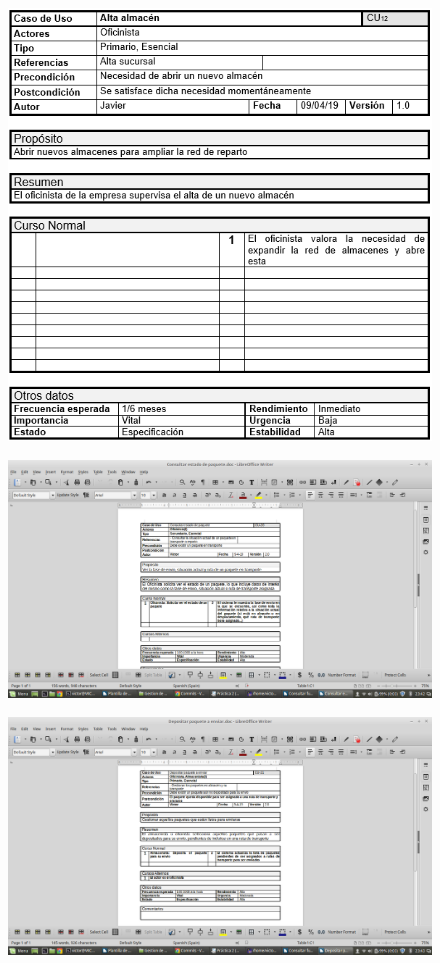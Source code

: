 \begin{figure}[H]
	\centering
	\includegraphics[width=16cm]{12}
\end{figure}
\begin{figure}[H]
	\centering
	\includegraphics[width=16cm]{20}
\end{figure}
\begin{figure}[H]
	\centering
	\includegraphics[width=16cm]{21}
\end{figure}
